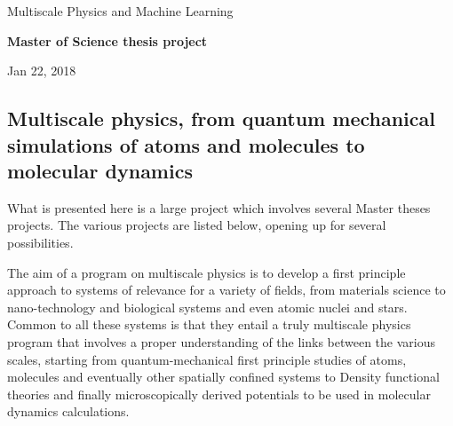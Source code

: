 \documentclass[%
oneside,                 %
final,                   %
10pt]{article}
\begin{document}

\newcommand{\exercisesection}[1]{\subsection*{#1}}






\thispagestyle{empty}

\begin{center}
{\LARGE\bf
\begin{spacing}{1.25}
Multiscale Physics and Machine Learning
\end{spacing}
}
\end{center}


\begin{center}
{\bf Master of Science thesis project${}^{}$} \\ [0mm]
\end{center}

\begin{center}
\end{center}
    

\begin{center}
Jan 22, 2018
\end{center}

\vspace{1cm}


\subsection*{Multiscale physics, from quantum mechanical simulations of atoms and molecules to molecular dynamics}

What is presented here is a large project which involves several
Master theses projects.  The various projects are listed below,
opening up for several possibilities.

The aim of a program on multiscale physics is to develop a first
principle approach to systems of relevance for a variety of fields,
from materials science to nano-technology and biological systems and
even atomic nuclei and stars.  Common to all these systems is that
they entail a truly multiscale physics program that involves a proper
understanding of the links between the various scales, starting from
quantum-mechanical first principle studies of atoms, molecules and
eventually other spatially confined systems to Density functional
theories and finally microscopically derived potentials to be used in
molecular dynamics calculations.
\end{document}
